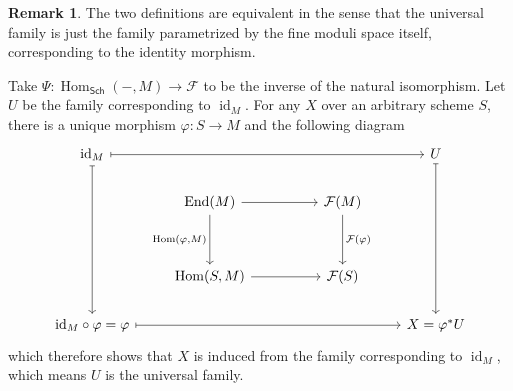 \documentclass[12pt]{article}
\theoremstyle{remark}
\theoremstyle{definition}
\newtheorem{remark}{Remark}[section]
\newcommand{\Hom}[0]{\operatorname{Hom}}
\newcommand{\id}[0]{\operatorname{id}}
\newcommand{\Sch}[0]{\mathsf{Sch}}
\begin{document}
    \begin{remark}
        The two definitions are equivalent in the sense that the universal family is just the family parametrized by the fine moduli space itself, corresponding to the identity morphism.

        Take $\Psi:\Hom_\Sch(-, M)\to \mathcal F$ to be the inverse of the natural isomorphism. Let $U$ be the family corresponding to $\id_M$. For any $X$ over an arbitrary scheme $S$, there is a unique morphism $\varphi:S\to M$ and the following diagram
        \[\begin{tikzcd}
            \text{id}_M \arrow[dddd, maps to] \arrow[rrrr, maps to] &                                                                                  &  &                                                 & U \arrow[dddd, maps to] \\
                                                                    & \operatorname{End}(M) \arrow[rr] \arrow[dd, "{\operatorname{Hom}(\varphi, M)}"'] &  & \mathcal F(M) \arrow[dd, "\mathcal F(\varphi)"] &                         \\
                                                                    &                                                                                  &  &                                                 &                         \\
                                                                    & {\operatorname{Hom}(S, M)} \arrow[rr]                                            &  & \mathcal F(S)                                   &                         \\
            \text{id}_M\circ\varphi=\varphi \arrow[rrrr, maps to]   &                                                                                  &  &                                                 & X=\varphi^*U           
            \end{tikzcd}\]
            which therefore shows that $X$ is induced from the family corresponding to $\id_M$, which means $U$ is the universal family.
    \end{remark}
\end{document}
